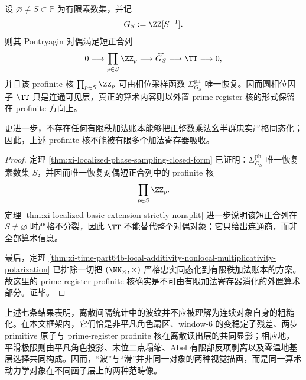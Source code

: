 \begin{theorem}[连续相位层与外置算术核]\label{thm:xi-time-part67-continuous-phase-external-arithmetic-kernel}
设 \(\varnothing\neq S\subset\mathbb P\) 为有限素数集，并记
\[
G_S:=\ZZ[S^{-1}].
\]
则其 Pontryagin 对偶满足短正合列
\[
0\longrightarrow \prod_{p\in S}\ZZ_p
\longrightarrow \widehat{G_S}
\longrightarrow \TT
\longrightarrow 0,
\]
并且该 profinite 核 \(\prod_{p\in S}\ZZ_p\) 可由相位采样函数 \(\Sigma^{\mathrm{ph}}_{G_S}\) 唯一恢复。因而圆相位因子 \(\TT\) 只是连通可见层，真正的算术内容则以外置 prime-register 核的形式保留在 profinite 方向上。

更进一步，不存在任何有限秩加法账本能够把正整数乘法幺半群忠实严格同态化；因此，上述 profinite 核不能被有限多个加法寄存器吸收。
\end{theorem}
\begin{proof}
定理 \ref{thm:xi-localized-phase-sampling-closed-form} 已证明：\(\Sigma^{\mathrm{ph}}_{G_S}\) 唯一恢复素数集 \(S\)，并因而唯一恢复对偶短正合列中的 profinite 核
\[
\prod_{p\in S}\ZZ_p.
\]
定理 \ref{thm:xi-localized-basic-extension-strictly-nonsplit} 进一步说明该短正合列在 \(S\neq\varnothing\) 时严格不分裂，因此 \(\TT\) 不能替代整个对偶对象；它只给出连通商，而非全部算术信息。

最后，定理 \ref{thm:xi-time-part64b-local-additivity-nonlocal-multiplicativity-polarization} 已排除一切把
\(
(\NN_{\times},\times)
\)
严格忠实同态化到有限秩加法账本的方案。故这里的 prime-register profinite 核确实是不可由有限加法寄存器消化的外置算术部分。证毕。
\end{proof}

\noindent
上述七条结果表明，离散间隔统计中的波纹并不应被理解为连续对象自身的粗糙化。在本文框架内，它们恰是非平凡角色扇区、window-\(6\) 的变稳定子残差、两步 primitive 原子与 prime-register profinite 核在离散读出层的共同显影；相应地，平滑极限则由平凡角色投影、末位二点塌缩、Abel 有限部反项剥离以及零温地基层选择共同构成。因而，“波”与“滑”并非同一对象的两种视觉描画，而是同一算术动力学对象在不同函子层上的两种范畴像。




\endinput
